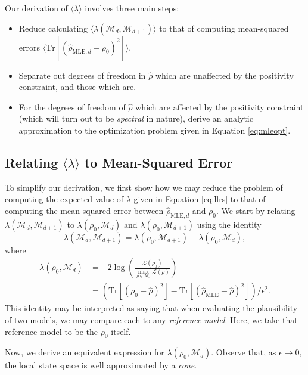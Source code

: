 \documentclass[aps,pra, twocolumn]{revtex4-1}
\newcommand{\M}{\mathcal{M}}
\newcommand{\rhohat}{\hat{\rho}}
\newcommand{\rhoMLE}{\rhohat_{\scriptscriptstyle\mathrm{MLE}}}
\begin{document}
Our derivation of $\langle \lambda \rangle$ involves three main steps:
\begin{itemize}
\item Reduce calculating $\langle \lambda(\M_{d}, \M_{d+1})\rangle$ to that of computing mean-squared errors $\langle \mathrm{Tr}[(\hat{\rho}_{\mathrm{MLE},d} - \rho_{0})^{2}]\rangle$.
\item Separate out degrees of freedom in $\rhohat$ which are unaffected by the positivity constraint, and those which are.
\item For the degrees of freedom of $\rhohat$ which are affected by the positivity constraint (which will turn out to be \emph{spectral} in nature), derive an analytic approximation to the optimization problem given in Equation \eqref{eq:mleopt}.
\end{itemize}

\subsection{Relating $\langle \lambda \rangle$ to Mean-Squared Error}

To simplify our derivation, we first show how we may reduce the problem of computing the expected value of $\lambda$ given in Equation \eqref{eq:llrs} to that of computing the mean-squared error between $\hat{\rho}_{\mathrm{MLE},d}$ and $\rho_{0}$. We start by relating $\lambda(\M_{d},\M_{d+1})$ to $\lambda(\rho_{0}, \M_{d})$ and $\lambda(\rho_{0}, \M_{d+1})$ using the identity
\begin{equation}
\lambda(\mathcal{M}_{d}, \mathcal{M}_{d + 1}) = \lambda(\rho_{0}, \mathcal{M}_{d+1}) - \lambda(\rho_{0}, \mathcal{M}_{d}),
\end{equation}
where
\begin{align}
\nonumber\lambda(\rho_{0}, \mathcal{M}_{d}) &= -2 \log \left(\frac{\mathcal{L}(\rho_{0})}{\underset{\rho \in \mathcal{M}_{d}}{\max}
\mathcal{L}(\rho)}\right)\\
& = (\mathrm{Tr}[(\rho_{0} - \hat{\rho})^{2}]- \mathrm{Tr}[(\rhoMLE - \hat{\rho})^{2}])/\epsilon^{2}.
\end{align}
This identity may be interpreted as saying that when evaluating the plausibility of two models, we may compare each to any \emph{reference model}. Here, we take that reference model to be the $\rho_{0}$ itself.

Now, we derive an equivalent expression for $\lambda(\rho_{0}, \M_{d})$. Observe that, as $\epsilon \rightarrow 0$, the local state space is well approximated by a \emph{cone}.
\end{document}
